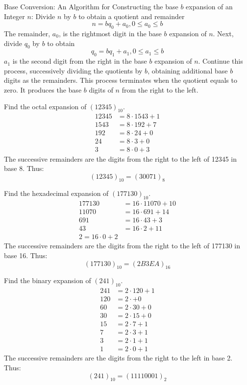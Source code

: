 \documentclass[12pt]{article}
\begin{document}
\begin{alg} Base Conversion: An Algorithm for Constructing the base $b$ expansion of an Integer $n$: Divide $n$ by $b$ to obtain a quotient and remainder $$n = bq_0 + a_0, 0 \leq a_0 \leq b$$ The remainder, $a_0$, is the rightmost digit in the base $b$ expansion of $n$. Next, divide $q_0$ by $b$ to obtain $$q_0 = bq_1 + a_1, 0 \leq a_1 \leq b$$ $a_1$ is the second digit from the right in the base $b$ expansion of $n$. Continue this process, successively dividing the quotients by $b$, obtaining additional base $b$ digits as the remainders. This process terminates when the quotient equals to zero. It produces the base $b$ digits of $n$ from the right to the left. \end{alg} 
\begin{example} Find the octal expansion of $(12345)_{10}$. $$\begin{aligned} 12345 &= 8 \cdot 1543 + 1 \\ 1543 &= 8 \cdot 192 + 7 \\ 192 &= 8 \cdot 24 + 0 \\ 24 &= 8 \cdot 3 + 0 \\ 3 &= 8 \cdot 0 + 3 \end{aligned} $$ The successive remainders are the digits from the right to the left of 12345 in base 8. Thus: $$ (12345)_{10} = (30071)_8$$ \end{example} 
\begin{example} Find the hexadecimal expansion of $(177130)_{10}$. $$\begin{aligned} 177130 &= 16 \cdot 11070 + 10 \\ 11070 &= 16 \cdot 691 + 14 \\ 691 &= 16 \cdot 43 + 3 \\ 43 &= 16 \cdot 2 + 11 \\ 2 = 16 \cdot 0 + 2 \end{aligned} $$ The successive remainders are the digits from the right to the left of 177130 in base 16. Thus: $$(177130)_{10} = (2B3EA)_{16}$$ \end{example} 
\begin{example} Find the binary expansion of $(241)_{10}$. $$\begin{aligned} 241 &= 2 \cdot 120 + 1 \\ 120 &= 2 \cdot + 0 \\ 60 &= 2 \cdot 30 + 0 \\ 30 &= 2 \cdot 15 + 0 \\ 15 &= 2 \cdot 7 + 1 \\ 7 &= 2 \cdot 3 + 1 \\ 3 &= 2 \cdot 1 + 1 \\ 1 &= 2 \cdot 0 + 1 \end{aligned} $$ The successive remainders are the digits from the right to the left in  base 2. Thus: $$(241)_{10} = (11110001)_2$$ \end{example} 
\end{document}
